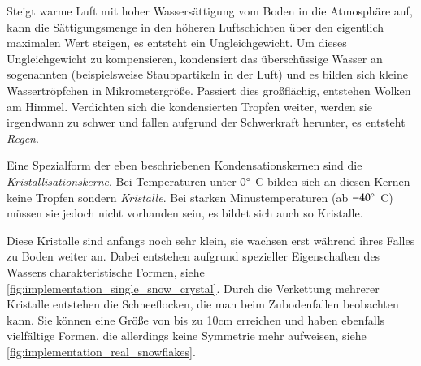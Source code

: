 Steigt warme Luft mit hoher Wassersättigung vom Boden in die
Atmosphäre auf, kann die Sättigungsmenge in den höheren Luftschichten
über den eigentlich maximalen Wert steigen, es entsteht ein
Ungleichgewicht. Um dieses Ungleichgewicht zu kompensieren, kondensiert
das überschüssige Wasser an sogenannten
 (beispielsweise Staubpartikeln in
der Luft) und es bilden sich kleine Wassertröpfchen in
Mikrometergröße. Passiert dies großflächig, entstehen Wolken am
Himmel. Verdichten sich die kondensierten Tropfen weiter, werden sie
irgendwann zu schwer und fallen aufgrund der Schwerkraft herunter, es
entsteht \emph{Regen}.

Eine Spezialform der eben beschriebenen Kondensationskernen sind die
\emph{Kristallisationskerne}. Bei Temperaturen unter $0^{\circ}$
C bilden sich an diesen Kernen keine Tropfen sondern \emph{Kristalle}.
Bei starken Minustemperaturen (ab $-40^{\circ}$ C) müssen sie
jedoch nicht vorhanden sein, es bildet sich auch so Kristalle.

Diese Kristalle sind anfangs noch sehr klein, sie wachsen erst während ihres
Falles zu Boden weiter an. Dabei entstehen aufgrund spezieller
Eigenschaften des Wassers charakteristische Formen, siehe
\autoref{fig:implementation_single_snow_crystal}. Durch die Verkettung
mehrerer Kristalle entstehen die Schneeflocken, die man beim
Zubodenfallen beobachten kann. Sie können eine Größe von bis zu 10cm
erreichen\cite{Nau96} und haben ebenfalls vielfältige Formen, die
allerdings keine Symmetrie mehr aufweisen, siehe
\autoref{fig:implementation_real_snowflakes}.

